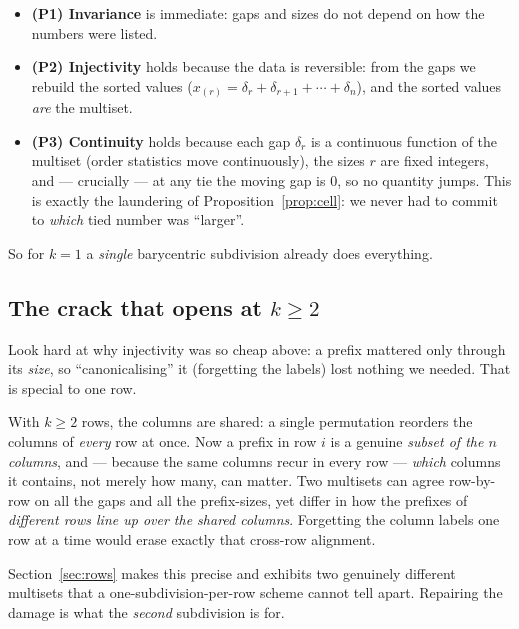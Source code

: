 \documentclass[11pt,a4paper]{article}
\theoremstyle{definition}
\theoremstyle{plain}
\begin{document}
\begin{itemize}[leftmargin=*]
\item \textbf{(P1) Invariance} is immediate: gaps and sizes do not depend on how
      the numbers were listed.
\item \textbf{(P2) Injectivity} holds because the data is reversible: from the
      gaps we rebuild the sorted values ($x_{(r)}=\delta_r+\delta_{r+1}+\cdots
      +\delta_n$), and the sorted values \emph{are} the multiset.
\item \textbf{(P3) Continuity} holds because each gap $\delta_r$ is a continuous
      function of the multiset (order statistics move continuously), the sizes
      $r$ are fixed integers, and --- crucially --- at any tie the moving gap is
      $0$, so no quantity jumps. This is exactly the laundering of
      Proposition~\ref{prop:cell}: we never had to commit to \emph{which}
      tied number was ``larger''.
\end{itemize}

\noindent
So for $k=1$ a \emph{single} barycentric subdivision already does everything.

\subsection{The crack that opens at $k\ge2$}
\label{sec:crack}

Look hard at why injectivity was so cheap above: a prefix mattered only through
its \emph{size}, so ``canonicalising'' it (forgetting the labels) lost nothing
we needed. That is special to one row.

With $k\ge2$ rows, the columns are shared: a single permutation reorders the
columns of \emph{every} row at once. Now a prefix in row $i$ is a genuine
\emph{subset of the $n$ columns}, and --- because the same columns recur in
every row --- \emph{which} columns it contains, not merely how many, can matter.
Two multisets can agree row-by-row on all the gaps and all the prefix-sizes, yet
differ in how the prefixes of \emph{different rows line up over the shared
columns}. Forgetting the column labels one row at a time would erase exactly
that cross-row alignment.

Section~\ref{sec:rows} makes this precise and exhibits two genuinely different
multisets that a one-subdivision-per-row scheme cannot tell apart. Repairing
the damage is what the \emph{second} subdivision is for.

\end{document}

